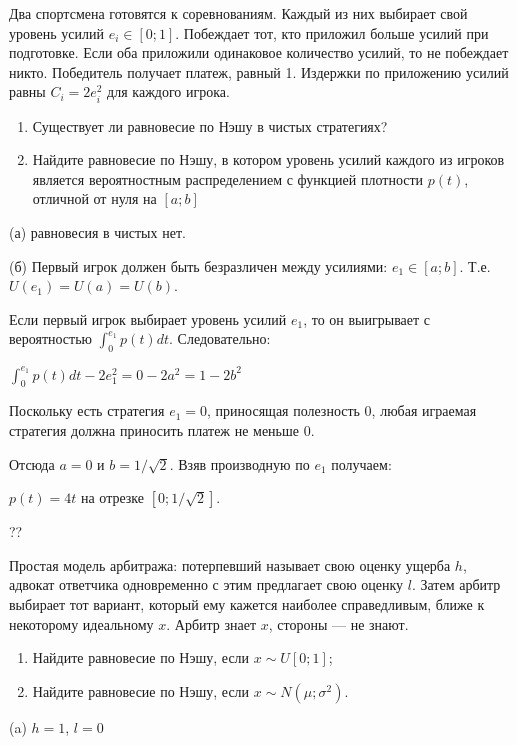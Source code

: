 \begin{problem}

Два спортсмена готовятся к соревнованиям. Каждый из них выбирает
свой уровень усилий $e_{i}\in[0;1]$. Побеждает тот, кто приложил
больше усилий при подготовке. Если оба приложили одинаковое
количество усилий, то не побеждает никто. Победитель получает
платеж, равный 1. Издержки по приложению усилий равны
$C_{i}=2e_{i}^{2}$ для каждого игрока. \par
\begin{enumerate}
\item Существует ли равновесие по Нэшу в чистых стратегиях? \par
\item Найдите равновесие по Нэшу, в котором уровень усилий каждого из 
игроков является 
вероятностным
распределением с
функцией плотности $p(t)$, отличной от нуля на $[a;b]$
\end{enumerate}


\begin{sol}

(а) равновесия в чистых нет. \par
(б) Первый игрок должен быть безразличен между усилиями:
$e_{1}\in [a;b]$. Т.е. $U(e_{1})=U(a)=U(b)$. \par
Если первый игрок выбирает уровень усилий $e_{1}$, то он
выигрывает с вероятностью $\int_{0}^{e_{1}}p(t)dt$.
Следовательно: \par
$\int_{0}^{e_{1}}p(t)dt-2e_{1}^{2}=0-2a^{2}=1-2b^{2}$ \par
Поскольку есть стратегия $e_{1}=0$, приносящая полезность 0, любая
играемая стратегия должна приносить платеж не меньше 0. \par
Отсюда $a=0$ и $b=1/\sqrt{2}$.
Взяв производную по $e_{1}$ получаем: \par
$p(t)=4t$ на отрезке $[0;1/\sqrt{2}]$.
\end{sol}
\end{problem}


\begin{problem}
\begin{source}
\cite{gibbons:ae}??
\end{source}
Простая модель арбитража: потерпевший называет свою оценку ущерба  $h$, адвокат ответчика одновременно с этим предлагает свою оценку  $l$. Затем арбитр выбирает тот вариант, который ему кажется наиболее справедливым, ближе к некоторому идеальному  $x$. Арбитр знает  $x$, стороны --- не знают.\par
\begin{enumerate}
\item Найдите равновесие по Нэшу, если  $x\sim U\left[0;1\right]$;\par
\item Найдите равновесие по Нэшу, если  $x\sim N\left(\mu ;\sigma ^{2} \right).$
\end{enumerate}

\begin{sol}
(a) $h=1$, $l=0$
\end{sol}
\end{problem}

